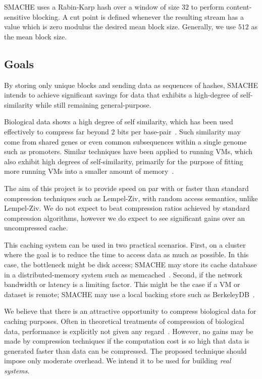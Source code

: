 \documentclass{sigplanconf}[11pt]
\begin{document}
SMACHE uses a Rabin-Karp hash over a window of size $32$ to perform
content-sensitive blocking.  A cut point is defined whenever the resulting
stream has a value which is zero modulus the desired mean block size.
Generally, we use $512$ as the mean block size.

\subsection*{Goals}
\label{sec:goals}

By storing only unique blocks and sending data as sequences of hashes, SMACHE
intends to achieve significant savings for data that exhibits a high-degree of
self-similarity while still remaining general-purpose.

Biological data shows a high degree of self similarity, which has been used
effectively to compress far beyond 2 bits per base-pair~\cite{biosequence}.
Such similarity may come from shared genes or even common subsequences within a
single genome such as promoters.  Similar techniques have been applied to
running VMs, which also exhibit high degrees of self-similarity, primarily for
the purpose of fitting more running VMs into a smaller amount of
memory~\cite{difference-engine}.

The aim of this project is to provide speed on par with or faster than standard
compression techniques such as Lempel-Ziv, with random access semantics, unlike
Lempel-Ziv.  We do not expect to beat compression ratios achieved by standard
compression algorithms, however we do expect to see significant gains over an
uncompressed cache.

This caching system can be used in two practical scenarios.  First, on a
cluster where the goal is to reduce the time to access data as much as
possible.  In this case, the bottleneck might be disk access; SMACHE may store
its cache database in a distributed-memory system such as
memcached~\cite{memcached}.  Second, if the network bandwidth or latency is a
limiting factor.  This might be the case if a VM or dataset is remote; SMACHE
may use a local backing store such as BerkeleyDB~\cite{berkeleydb}.

We believe that there is an attractive opportunity to compress biological data
for caching purposes.  Often in theoretical treatments of compression of
biological data, performance is explicitly not given any
regard~\cite{statistical}.  However, no gains may be made by compression
techniques if the computation cost is so high that data is generated faster
than data can be compressed.  The proposed technique should impose only
moderate overhead.  We intend it to be used for building {\em real systems}.
\end{document}
